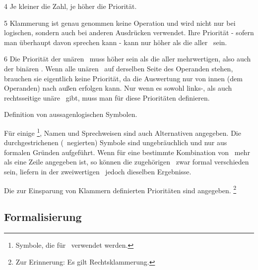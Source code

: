 \begin{table}
\begin{threeparttable}
\begin{tablenotes}
			\item[4] Je kleiner die Zahl, je höher die Priorität.
			\item[5] Klammerung ist genau genommen keine Operation und wird nicht nur bei logischen, sondern auch bei anderen Ausdrücken verwendet. Ihre Priorität - sofern man überhaupt davon sprechen kann - kann nur höher als die aller \Junktoren\ sein.
			\item[6] Die Priorität der unären \Operatoren\ muss höher sein als die aller mehrwertigen, also auch der binären \Operatoren.
			Wenn alle unären \Operatoren\ auf derselben Seite des Operanden stehen, brauchen sie eigentlich keine Priorität, da die Auswertung nur von innen (dem Operanden) nach außen erfolgen kann.
			Nur wenn es sowohl links-, als auch rechtsseitige unäre \Operatoren\ gibt, muss man für diese Prioritäten definieren.
		\end{tablenotes}
	\end{threeparttable}
	\caption{Definition von aussagenlogischen Symbolen.}
	\label{tab:Symbole}%
\end{table}

Für einige \Junktorsymbole%
\footnote{%
	Symbole, die für \Junktoren\ verwendet werden.
},
Namen und Sprechweisen sind auch Alternativen angegeben.
Die durchgestrichenen (\textdh\ negierten) Symbole sind ungebräuchlich und nur aus formalen Gründen aufgeführt.
Wenn für eine bestimmte Kombination von \Wahrheitswerten\ mehr als eine Zeile angegeben ist, so können die zugehörigen \Junktoren\ zwar formal verschieden sein, liefern in der zweiwertigen \Aussagenlogik\ jedoch dieselben Ergebnisse.

Die zur Einsparung von Klammern definierten Prioritäten sind  angegeben.%
\footnote{Zur Erinnerung: Es gilt Rechtsklammerung. }

\subsection{Formalisierung}%
\label{sub:Formalisierung}

